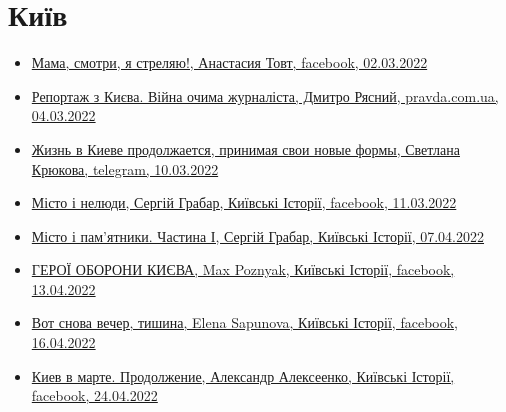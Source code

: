  
 
 
 
 

\section{Київ}
\label{sec:topics.vojna.kiev}



\begin{itemize} %
\item \hyperlink{02_03_2022.fb.tovt_anastasia.1.mama_smotri_ja_streljaju}{%
Мама, смотри, я стреляю!, Анастасия Товт, facebook, 02.03.2022%
}

\item \hyperlink{04_03_2022.stz.news.ua.pravda.1.reportazh_z_kieva}{%
Репортаж з Києва. Війна очима журналіста, Дмитро Рясний, pravda.com.ua, 04.03.2022%
}

\item \hyperlink{10_03_2022.tg.krjukova_svetlana.1.zhizn_v_kieve}{%
Жизнь в Киеве продолжается, принимая свои новые формы, Светлана Крюкова, telegram, 10.03.2022
}

\item \hyperlink{11_03_2022.fb.fb_group.story_kiev_ua.2.misto_i_neljudy}{%
Місто і нелюди, Сергій Грабар, Київські Історії, facebook, 11.03.2022%
}

\item \hyperlink{07_04_2022.fb.fb_group.story_kiev_ua.1.misto_i_pamjatnyky_chastyna_1}{%
Місто і пам'ятники. Частина І, Сергій Грабар, Київські Історії, 07.04.2022%
}

\item \hyperlink{13_04_2022.fb.fb_group.story_kiev_ua.1.geroi_oborony_kieva}{%
ГЕРОЇ ОБОРОНИ КИЄВА, Max Poznyak, Київські Історії, facebook, 13.04.2022%
}

\item \hyperlink{16_04_2022.fb.fb_group.story_kiev_ua.1.vecher_tishina}{%
Вот снова вечер, тишина, Elena Sapunova, Київські Історії, facebook, 16.04.2022%
}

\item \hyperlink{24_04_2022.fb.fb_group.story_kiev_ua.1.kiev_v_marte_prodolzhenie}{%
Киев в марте. Продолжение, Александр Алексеенко, Київські Історії, facebook, 24.04.2022%
}

\end{itemize} %
